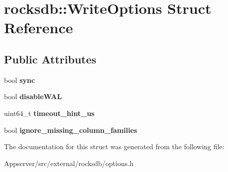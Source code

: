 \hypertarget{structrocksdb_1_1WriteOptions}{}\section{rocksdb\+:\+:Write\+Options Struct Reference}
\label{structrocksdb_1_1WriteOptions}
\subsection*{Public Attributes}
\begin{DoxyCompactItemize}
\item 
bool {\bfseries sync}\hypertarget{structrocksdb_1_1WriteOptions_a56a39368dc60d785a1ca50ccb87910c9}{}\label{structrocksdb_1_1WriteOptions_a56a39368dc60d785a1ca50ccb87910c9}

\item 
bool {\bfseries disable\+W\+AL}\hypertarget{structrocksdb_1_1WriteOptions_a5774a33c44c56c1fc7d9dbf1526c4a73}{}\label{structrocksdb_1_1WriteOptions_a5774a33c44c56c1fc7d9dbf1526c4a73}

\item 
uint64\+\_\+t {\bfseries timeout\+\_\+hint\+\_\+us}\hypertarget{structrocksdb_1_1WriteOptions_a07ac34c8f233fd435b1f9e0857ca00ff}{}\label{structrocksdb_1_1WriteOptions_a07ac34c8f233fd435b1f9e0857ca00ff}

\item 
bool {\bfseries ignore\+\_\+missing\+\_\+column\+\_\+families}\hypertarget{structrocksdb_1_1WriteOptions_acf2f58b4342cbce0e89c6efe43a56445}{}\label{structrocksdb_1_1WriteOptions_acf2f58b4342cbce0e89c6efe43a56445}

\end{DoxyCompactItemize}


The documentation for this struct was generated from the following file\+:\begin{DoxyCompactItemize}
\item 
Appserver/src/external/rocksdb/options.\+h\end{DoxyCompactItemize}
